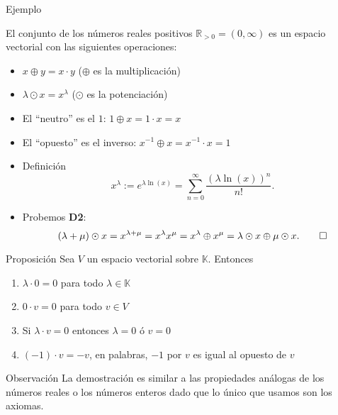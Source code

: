 \documentclass[handout]{beamer} %
\newcommand{\R}{\mathbb R}
\newcommand{\K}{\mathbb K}
\begin{document}
        
        \begin{frame}
        
        \begin{block}{Ejemplo}

        El conjunto de los números reales positivos
        $\R_{>0}=(0,\infty)$ es un espacio vectorial con las siguientes operaciones:
        \begin{itemize}
         \item $x\oplus y=x\cdot y$ ($\oplus$ es la multiplicación)
         \item $\lambda\odot x=x^\lambda$ ($\odot$ es la potenciación)
        
        
         \item El ``neutro'' es el $1$: $1\oplus x=1\cdot x=x$
         \item El ``opuesto'' es el inverso: $x^{-1}\oplus x=x^{-1}\cdot x=1$
        \end{itemize}
        \end{block}
        \pause
        \begin{observacion}
            \begin{itemize}
                \item Definición  
                $$x^\lambda := e^{\lambda\ln(x)} = \sum_{n=0}^\infty \frac{(\lambda\ln(x))^n}{n!}.$$
                \item Probemos \textbf{D2}: \pause
                $$ (\lambda + \mu )\odot x = x^{\lambda + \mu} = x^{\lambda}x^{\mu} = 
                x^{\lambda}\oplus x^{\mu} =  \lambda\odot x \oplus \mu\odot x.\qed
                $$
            \end{itemize}
            
        \end{observacion}
        \end{frame}
       
        
        \begin{frame}
        \begin{block}{Proposición}
        Sea $V$ un espacio vectorial sobre $\K$. Entonces\pause
        \begin{enumerate}
         \item $\lambda\cdot 0=0$ para todo $\lambda\in \K$\pause
         \item $0\cdot v=0$ para todo $v\in V$\pause
         \item Si $\lambda\cdot v=0$ entonces $\lambda=0$ ó $v=0$\pause
         \item $(-1)\cdot v=-v$, en palabras, $-1$ por $v$ es igual al opuesto de $v$
        \end{enumerate}
        \end{block}
        \pause
        \begin{block}{Observación}
        La demostración es similar  a las propiedades análogas de los números reales  o los números enteros dado que lo único que usamos son los axiomas.
        \end{block}
        
        \end{frame}
        
\end{document}
